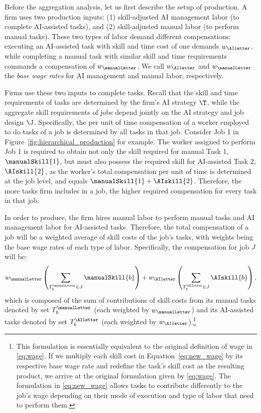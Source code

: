 Before the aggregation analysis, let us first describe the setup of production.
A firm uses two production inputs: (1) skill-adjusted AI management labor (to complete AI-assisted tasks), and (2) skill-adjusted manual labor (to perform manual tasks).
These two types of labor demand different compensations: executing an AI-assisted task with skill and time cost of one demands $w_{\AIletter}$, while completing a manual task with similar skill and time requirements commands a compensation of $w_{\manualLetter}$.
We call $w_{\AIletter}$ and $w_{\manualLetter}$ the \emph{base wage rates} for AI management and manual labor, respectively.

Firms use these two inputs to complete tasks.
Recall that the skill and time requirements of tasks are determined by the firm's AI strategy $\T$, while the aggregate skill requirements of jobs depend jointly on the AI strategy and job design $\J$.
Specifically, the per unit of time compensation of a worker employed to do tasks of a job is determined by all tasks in that job.
Consider Job 1 in Figure~\ref{fig:hierarchical_production} for example.
The worker assigned to perform Job 1 is required to obtain not only the skill required for manual Task 1, $\manualSkill{1}$, but must also possess the required skill for AI-assisted Task 2, $\AIskill{2}$, as the worker's total compensation per unit of time is determined at the job level, and equals $\manualSkill{1} + \AIskill{2}$.
Therefore, the more tasks firm includes in a job, the higher required compensation for every task in that job.

In order to produce, the firm hires manual labor to perform manual tasks and AI management labor for AI-assisted tasks.
Therefore, the total compensation of a job will be a weighted average of skill costs of the job's tasks, with weights being the base wage rates of each type of labor.
Specifically, the compensation for job $J$ will be:
\begin{equation}
w_{\manualLetter} \left(\sum_{T_b^{\manualLetter} \in J} \manualSkill{b}\right) + w_{\AIletter} \left(\sum_{T_b^{\AIletter} \in J} \AIskill{b}\right),\label{eq:new_wage}
\end{equation}
which is composed of the sum of contributions of skill costs from its manual tasks denoted by set $T_b^{\manualLetter}$ (each weighted by $w_{\manualLetter}$) and its AI-assisted tasks denoted by set $T_b^{\AIletter}$ (each weighted by $w_{\AIletter}$).\footnote{
This formulation is essentially equivalent to the original definition of wage in \eqref{eq:wage}.
If we multiply each skill cost in Equation~\eqref{eq:new_wage} by its respective base wage rate and redefine the task's skill cost as the resulting product, we arrive at the original formulation given by \eqref{eq:wage}.
The formulation in \eqref{eq:new_wage} allows tasks to contribute differently to the job's wage depending on their mode of execution and type of labor that need to perform them.}

